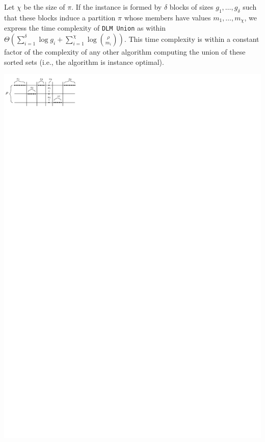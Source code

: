 %
Let $\chi$ be the size of $\pi$.
%
If the instance is formed by $\delta$ blocks of sizes $g_1, \dots, g_{\delta}$ such that these blocks induce a partition $\pi$ whose members have values $m_1, \dots, m_{\chi}$, we express the time complexity of \texttt{DLM Union} as within $\Theta(\sum^{\delta}_{i=1}\log g_i + \sum^{\chi}_{i=1}\log{\binom{\rho}{m_i}})$.
%
This time complexity is within a constant factor of the complexity of any other algorithm computing the union of these sorted sets (i.e., the algorithm is instance optimal).

\begin{minipage}[c]{.45\textwidth}
  \centering
  \includegraphics[scale=1.2]{union_instance1}
\end{minipage}\hfill
\begin{minipage}[c]{.45\textwidth}
  \label{fig:instance}
\end{minipage}

